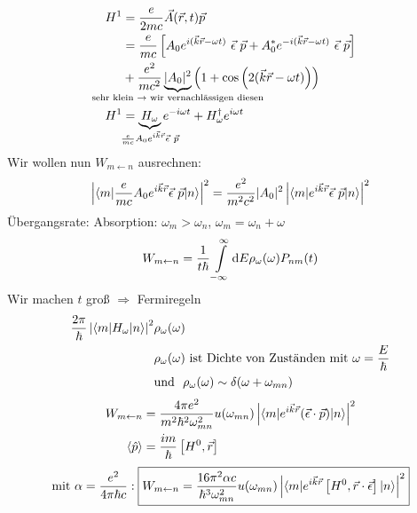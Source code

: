 		\begin{align*}
			H^1 &= \frac{e}{2 m c} \vec{A} (\vec{r} , t) \vec{p} \\
			&= \frac{e}{m c}
			\left[A_0 e^{i(\vec{k} \vec{r} - \omega t)} ~\vec{\epsilon}~\vec{p}
			+ A^*_0 e^{-i(\vec{k} \vec{r} - \omega t)} ~\vec{\epsilon}~\vec{p}
			\right] \\
			&+ \frac{e^2}{m c^2} \underbrace{|A_0|^2}_{\mathclap{\text{sehr klein~} \rightarrow \text{~wir vernachlässigen diesen}}} 
			\left(1 + \cos \left(2 (\vec{k} \vec{r} - \omega t)\right)\right) \\
			H^1 &= \underbrace{H_\omega}_{\mathclap{\frac{e}{m c} A_0 e^{i \vec{k} \vec{r}} \vec{\epsilon}~\vec{p}}} 
			e^{-i \omega t} 
			+ H_\omega^\dagger e^{i \omega t}
		\end{align*}
	Wir wollen nun $W_{m \leftarrow n}$ ausrechnen:
		\begin{align*}
			\left|\braket{m | \frac{e}{m c} A_0 e^{i \vec{k} \vec{r}} \vec{\epsilon}~\vec{p} |n}\right|^2
			= \frac{e^2}{m^2 c^2} |A_0|^2 \left| \braket{m | e^{i \vec{k} \vec{r}} \vec{\epsilon}~\vec{p} | n}\right|^2
		\end{align*}
	Übergangsrate: Absorption: $\omega_m > \omega_n$, $\omega_m = \omega_n + \omega$
		\begin{equation*}
			W_{m \leftarrow n} = 
			\frac{1}{t \hbar} \int \limits_{-\infty}^{\infty} 
			\mathrm{d} E \rho_\omega (\omega) P_{nm} (t)
		\end{equation*}
	Wir machen $t$ groß $\Rightarrow$ Fermiregeln
		\begin{align*}
			\frac{2 \pi}{\hbar} \left|\braket{m | H_\omega | n}\right|^2 &\rho_\omega (\omega) \\
			&\rho_\omega (\omega) \text{~ist Dichte von Zuständen mit~} \omega = \frac{E}{\hbar} \\
			&\text{und~ }\rho_\omega (\omega)\sim \delta (\omega + \omega_{mn})
		\end{align*}
		\begin{align*}
			W_{m \leftarrow n} &= 
			\frac{4 \pi e^2}{m^2 \hbar^2 \omega_{mn}^2} u(\omega_{mn}) 
			\left|\braket{m | e^{i \vec{k} \vec{r}} (\vec{\epsilon} \cdot \vec{p}) | n}\right|^2 \\
			\langle {\hat{p}} \rangle &= \frac{i m}{\hbar} \left[H^0 , \vec{r} \right] 
		\end{align*}
		\begin{align*}
			\text{mit~}\alpha = \frac{e^2}{4 \pi \hbar c} :
			\boxed{W_{m \leftarrow n} = \frac{16 \pi^2 \alpha c}{\hbar^3 \omega_{mn}^2} 
				u (\omega_{mn}) \left|\braket{m | e^{i \vec{k} \vec{r}} \left[H^0 , \vec{r} \cdot \vec{\epsilon}\right] | n}\right|^2
			}
		\end{align*}
